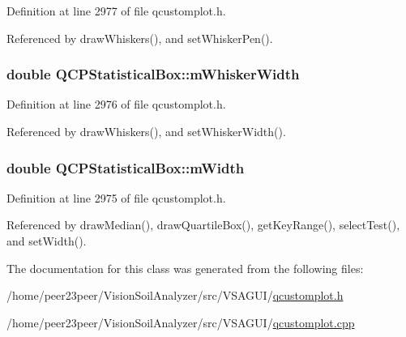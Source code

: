 Definition at line 2977 of file qcustomplot.\+h.



Referenced by draw\+Whiskers(), and set\+Whisker\+Pen().

\hypertarget{class_q_c_p_statistical_box_a4d166474f845d5db626e8b11a0815a6f}{}
\subsubsection[{m\+Whisker\+Width}]{\setlength{\rightskip}{0pt plus 5cm}double Q\+C\+P\+Statistical\+Box\+::m\+Whisker\+Width\hspace{0.3cm}{\ttfamily [protected]}}\label{class_q_c_p_statistical_box_a4d166474f845d5db626e8b11a0815a6f}


Definition at line 2976 of file qcustomplot.\+h.



Referenced by draw\+Whiskers(), and set\+Whisker\+Width().

\hypertarget{class_q_c_p_statistical_box_af365e40b0f706c3d76f857c7957f629d}{}
\subsubsection[{m\+Width}]{\setlength{\rightskip}{0pt plus 5cm}double Q\+C\+P\+Statistical\+Box\+::m\+Width\hspace{0.3cm}{\ttfamily [protected]}}\label{class_q_c_p_statistical_box_af365e40b0f706c3d76f857c7957f629d}


Definition at line 2975 of file qcustomplot.\+h.



Referenced by draw\+Median(), draw\+Quartile\+Box(), get\+Key\+Range(), select\+Test(), and set\+Width().



The documentation for this class was generated from the following files\+:\begin{DoxyCompactItemize}
\item 
/home/peer23peer/\+Vision\+Soil\+Analyzer/src/\+V\+S\+A\+G\+U\+I/\hyperlink{qcustomplot_8h}{qcustomplot.\+h}\item 
/home/peer23peer/\+Vision\+Soil\+Analyzer/src/\+V\+S\+A\+G\+U\+I/\hyperlink{qcustomplot_8cpp}{qcustomplot.\+cpp}\end{DoxyCompactItemize}
